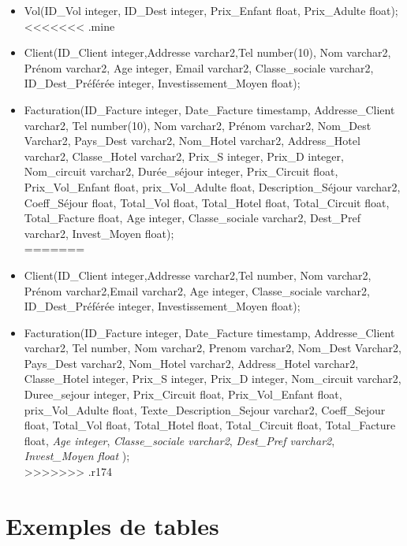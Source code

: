\documentclass[10pt]{article}
\begin{document}
\begin{itemize}
\item Vol(ID\_Vol integer, ID\_Dest integer, Prix\_Enfant float, Prix\_Adulte float);\\
<<<<<<< .mine
\item Client(ID\_Client integer,Addresse varchar2,Tel number(10), Nom varchar2, Prénom varchar2, Age integer, Email varchar2, Classe\_sociale varchar2, ID\_Dest\_Préférée integer, Investissement\_Moyen float);\\
\item Facturation(ID\_Facture integer, Date\_Facture timestamp, Addresse\_Client varchar2, Tel number(10), Nom varchar2, Prénom varchar2, Nom\_Dest Varchar2, Pays\_Dest varchar2, Nom\_Hotel varchar2, Address\_Hotel varchar2, Classe\_Hotel varchar2, Prix\_S integer, Prix\_D integer, Nom\_circuit varchar2, Durée\_séjour integer, Prix\_Circuit float, Prix\_Vol\_Enfant float, prix\_Vol\_Adulte float, Description\_Séjour varchar2, Coeff\_Séjour float, Total\_Vol float, Total\_Hotel float,  Total\_Circuit float, Total\_Facture float, Age integer, Classe\_sociale varchar2, Dest\_Pref varchar2, Invest\_Moyen float);\\
=======
\item Client(ID\_Client integer,Addresse varchar2,Tel number, Nom varchar2, Prénom varchar2,Email varchar2, Age integer, Classe\_sociale varchar2, ID\_Dest\_Préférée integer, Investissement\_Moyen float);\\
\item Facturation(ID\_Facture integer, Date\_Facture timestamp, Addresse\_Client varchar2, Tel number, Nom varchar2, Prenom varchar2, Nom\_Dest Varchar2, Pays\_Dest varchar2, Nom\_Hotel varchar2, Address\_Hotel varchar2, Classe\_Hotel integer, Prix\_S integer, Prix\_D integer, Nom\_circuit varchar2, Duree\_sejour integer, Prix\_Circuit float, Prix\_Vol\_Enfant float, prix\_Vol\_Adulte float, Texte\_Description\_Sejour varchar2, Coeff\_Sejour float, Total\_Vol float, Total\_Hotel float,  Total\_Circuit float, Total\_Facture float, \textit{Age integer}, \textit{Classe\_sociale varchar2}, \textit{Dest\_Pref varchar2}, \textit{Invest\_Moyen float} );\\
>>>>>>> .r174
\end{itemize}

\section{Exemples de tables}

\end{document}

